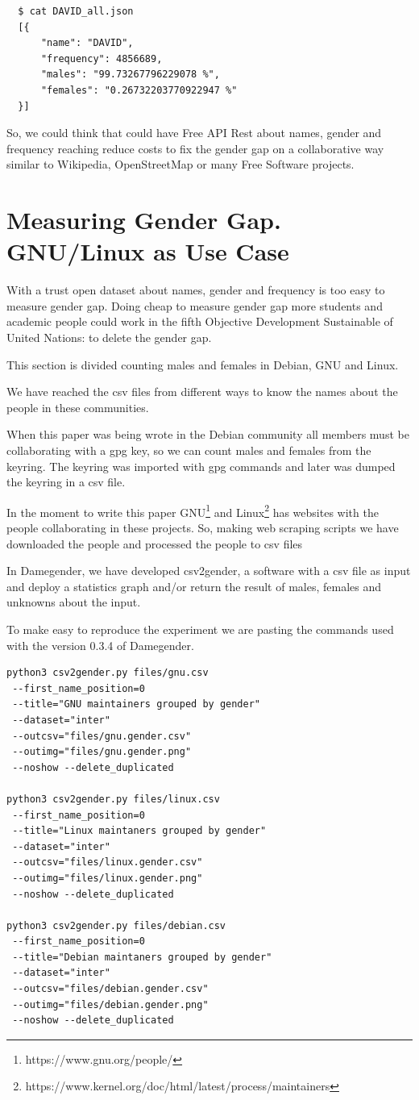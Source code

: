\documentclass[a4paper]{article}
\begin{document}
\begin{verbatim}
  $ cat DAVID_all.json
  [{
      "name": "DAVID",
      "frequency": 4856689,
      "males": "99.73267796229078 %",
      "females": "0.26732203770922947 %"
  }]
\end{verbatim}

So, we could think that could have Free API Rest about names, gender
and frequency reaching reduce costs to fix the gender gap on a
collaborative way similar to Wikipedia, OpenStreetMap or many Free
Software projects.

\section{Measuring Gender Gap. GNU/Linux as Use Case}
\label{sec:measuring}

With a trust open dataset about names, gender and frequency is too
easy to measure gender gap. Doing cheap to measure gender gap more
students and academic people could work in the fifth Objective
Development Sustainable of United Nations: to delete the gender gap.

This section is divided counting males and females in Debian, GNU and
Linux.

We have reached the csv files from different ways to know the names
about the people in these communities.

When this paper was being wrote in the Debian community all members
must be collaborating with a gpg key, so we can count males and females
from the keyring. The keyring was imported with gpg commands and later
was dumped the keyring in a csv file.

In the moment to write this paper
GNU\footnote{https://www.gnu.org/people/} and
Linux\footnote{https://www.kernel.org/doc/html/latest/process/maintainers}
has websites with the people collaborating in these projects. So,
making web scraping scripts we have downloaded the people and processed
the people to csv files

In Damegender, we have developed csv2gender, a software with a csv
file as input and deploy a statistics graph and/or return the result
of males, females and unknowns about the input.

To make easy to reproduce the experiment we are pasting the commands
used with the version 0.3.4 of Damegender.

\begin{verbatim}
python3 csv2gender.py files/gnu.csv
 --first_name_position=0
 --title="GNU maintainers grouped by gender"
 --dataset="inter"
 --outcsv="files/gnu.gender.csv"
 --outimg="files/gnu.gender.png"
 --noshow --delete_duplicated

python3 csv2gender.py files/linux.csv
 --first_name_position=0
 --title="Linux maintaners grouped by gender"
 --dataset="inter"
 --outcsv="files/linux.gender.csv"
 --outimg="files/linux.gender.png"
 --noshow --delete_duplicated

python3 csv2gender.py files/debian.csv
 --first_name_position=0
 --title="Debian maintaners grouped by gender"
 --dataset="inter"
 --outcsv="files/debian.gender.csv"
 --outimg="files/debian.gender.png"
 --noshow --delete_duplicated
\end{verbatim}
\end{document}

